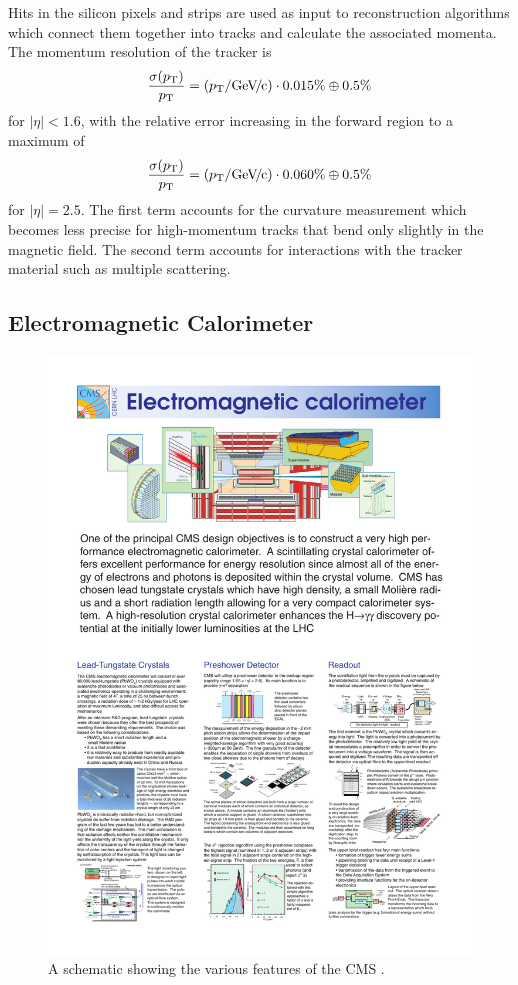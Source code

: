 Hits in the silicon pixels and strips are used as input to reconstruction algorithms which connect them together into tracks and calculate the associated momenta.  The momentum resolution of the tracker is 
\begin{equation}
  \frac{\sigma(p_{\mathrm{T}})}{p_{\mathrm{T}}} = (p_{\mathrm{T}}/{\text{Ge\hspace{-.08em}V\hspace{-0.16em}/\hspace{-0.08em}c}}) \cdot 0.015\% \oplus 0.5\%
\end{equation}
for $|\eta| < 1.6$, with the relative error increasing in the forward region to a maximum of
\begin{equation}
  \frac{\sigma(p_{\mathrm{T}})}{p_{\mathrm{T}}} = (p_{\mathrm{T}}/{\text{Ge\hspace{-.08em}V\hspace{-0.16em}/\hspace{-0.08em}c}}) \cdot 0.060\% \oplus 0.5\%
\end{equation}
for $|\eta| = 2.5$.  The first term accounts for the curvature measurement which becomes less precise for high-momentum tracks that bend only slightly in the magnetic field.  The second term accounts for interactions with the tracker material such as multiple scattering.

\subsection{Electromagnetic Calorimeter}
\label{sec:ecal}

\begin{figure}
  \centering
  \includegraphics[width=\textwidth]{figures/cms-ecal}
  \caption{A schematic showing the various features of the CMS \ecal.}
  \label{fig:cms-ecal}
\end{figure}

